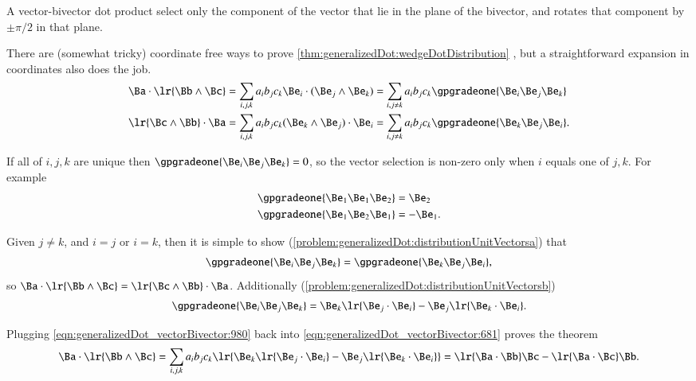 A vector-bivector dot product select only the component of the vector that lie in the plane of the bivector, and rotates that component by \( \pm \pi/2 \) in that plane.

There are (somewhat tricky) coordinate free ways to prove
\cref{thm:generalizedDot:wedgeDotDistribution}
, but a straightforward expansion in coordinates also does the job.
\begin{dmath}\label{eqn:generalizedDot_vectorBivector:681}
\begin{aligned}
\Ba \cdot \lr{ \Bb \wedge \Bc } &= \sum_{i, j, k} a_i b_j c_k \Be_i \cdot (\Be_j \wedge \Be_k)
= \sum_{i, j \ne k} a_i b_j c_k \gpgradeone{ \Be_i \Be_j \Be_k }
\\
\lr{ \Bc \wedge \Bb } \cdot \Ba &= \sum_{i, j, k} a_i b_j c_k (\Be_k \wedge \Be_j) \cdot \Be_i
= \sum_{i, j \ne k} a_i b_j c_k \gpgradeone{ \Be_k \Be_j \Be_i }.
\end{aligned}
\end{dmath}

If all of \( i, j, k \) are unique then \( \gpgradeone{ \Be_i \Be_j \Be_k } = 0 \), so the vector selection is non-zero only when \( i \) equals one of \( j, k \).
For example
\begin{dmath}\label{eqn:generalizedDot_vectorBivector:1040}
\begin{aligned}
\gpgradeone{ \Be_1 \Be_1 \Be_2 } &= \Be_2 \\
\gpgradeone{ \Be_1 \Be_2 \Be_1 } &= -\Be_1.
\end{aligned}
\end{dmath}

Given \( j \ne k \), and \( i = j \) or \( i = k \),  then it is simple to show
(\cref{problem:generalizedDot:distributionUnitVectorsa})
that
\begin{equation}\label{eqn:generalizedDot_vectorBivector:1020}
\gpgradeone{ \Be_i \Be_j \Be_k }
= \gpgradeone{ \Be_k \Be_j \Be_i },
\end{equation}
so \( \Ba \cdot \lr{ \Bb \wedge \Bc } = \lr{ \Bc \wedge \Bb } \cdot \Ba \).
Additionally
(\cref{problem:generalizedDot:distributionUnitVectorsb})
\begin{equation}\label{eqn:generalizedDot_vectorBivector:980}
\gpgradeone{ \Be_i \Be_j \Be_k }
=
\Be_k \lr{ \Be_j \cdot \Be_i }
-\Be_j \lr{ \Be_k \cdot \Be_i }.
\end{equation}

Plugging \cref{eqn:generalizedDot_vectorBivector:980} back into \cref{eqn:generalizedDot_vectorBivector:681} proves the theorem
\begin{dmath}\label{eqn:generalizedDot_vectorBivector:1060}
\Ba \cdot \lr{ \Bb \wedge \Bc }
= \sum_{i, j, k} a_i b_j c_k \lr{ \Be_k \lr{ \Be_j \cdot \Be_i }
-\Be_j \lr{ \Be_k \cdot \Be_i } }
=
\lr{ \Ba \cdot \Bb } \Bc
- \lr{ \Ba \cdot \Bc } \Bb.
\end{dmath}


